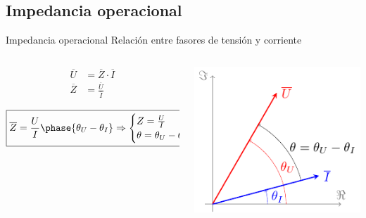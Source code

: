 \documentclass[aspectratio=169, xcolor={usenames,svgnames,dvipsnames}]{beamer}
\begin{document}
\subsection{Impedancia operacional}

\begin{frame}{Impedancia operacional}
{Relación entre fasores de tensión y corriente}
\begin{columns}
\begin{column}{0.5\columnwidth}
\begin{align*}
  \overline{U} &= \overline{Z} \cdot \overline{I}\\                 
  \overline{Z} &= \frac{\overline{U}}{\overline{I}}
\end{align*}

\[
\boxed{\overline{Z} = \frac{U}{I}\phase{\theta_U - \theta_I} \Rightarrow 
    \begin{cases}
      Z = \frac{U}{I}\\
      \theta = \theta_U - \theta_I
    \end{cases}}
\]
\end{column}


\begin{column}{0.5\columnwidth}
\begin{center}
\includegraphics[height=0.5\textheight]{../figs/fasorTensionCorriente.pdf}
\end{center}
\end{column}
\end{columns}

\end{frame}
\end{document}
